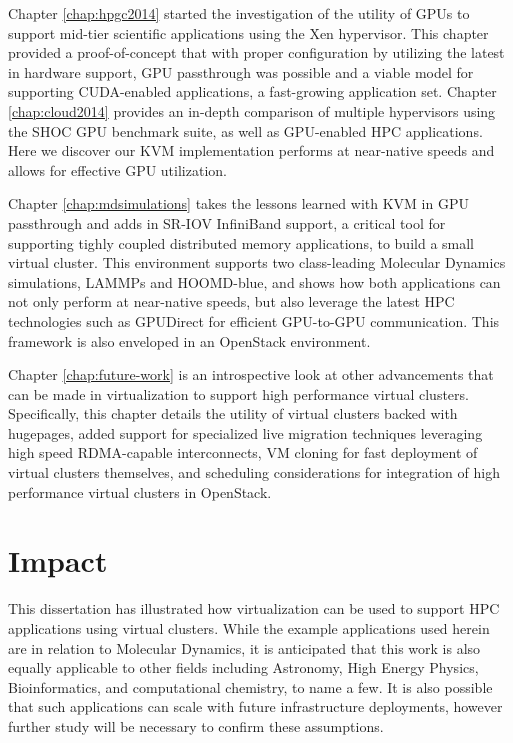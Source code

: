 Chapter \ref{chap:hpgc2014} started the investigation of the utility of GPUs to support mid-tier scientific applications using the Xen hypervisor. This chapter provided a proof-of-concept that with proper configuration by utilizing the latest in hardware support, GPU passthrough was possible and a viable model for supporting CUDA-enabled applications, a fast-growing application set. Chapter \ref{chap:cloud2014} provides an in-depth comparison of multiple hypervisors using the SHOC GPU benchmark suite, as well as GPU-enabled HPC applications. Here we discover our KVM implementation performs at near-native speeds and allows for effective GPU utilization. 

Chapter \ref{chap:mdsimulations} takes the lessons learned with KVM in GPU passthrough and adds in SR-IOV InfiniBand support, a critical tool for supporting tighly coupled distributed memory applications, to build a small virtual cluster. This environment supports two class-leading Molecular Dynamics simulations, LAMMPs and HOOMD-blue, and shows how both applications can not only perform at near-native speeds, but also leverage the latest HPC technologies such as GPUDirect for efficient GPU-to-GPU communication. This framework is also enveloped in an OpenStack environment.     

Chapter \ref{chap:future-work} is an introspective look at other advancements that can be made in virtualization to support high performance virtual clusters. Specifically, this chapter details the utility of virtual clusters backed with hugepages, added support for specialized live migration techniques leveraging high speed RDMA-capable interconnects, VM cloning for fast deployment of virtual clusters themselves, and scheduling considerations for integration of high performance virtual clusters in OpenStack.  




\section{Impact}
\label{sec:impact}

This dissertation has illustrated how virtualization can be used to support HPC applications using virtual clusters.  While the example applications used herein are in relation to Molecular Dynamics, it is anticipated that this work is also equally applicable to other fields including Astronomy, High Energy Physics, Bioinformatics, and computational chemistry, to name a few. It is also possible that such applications can scale with future infrastructure deployments, however further study will be necessary to confirm these assumptions.


